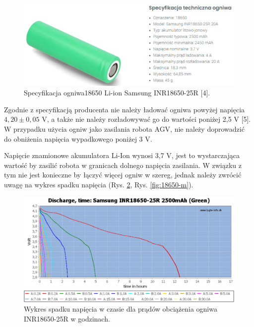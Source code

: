\documentclass{report}
\begin{document}
\begin{enumerate}[label=(\Alph*)]
    \begin{figure}[H]
        \centering
        \includegraphics{src/tech_specifications/Li-ion Samsung INR18650-25R .png}
        \caption{Specyfikacja ogniwa18650 Li-ion Samsung INR18650-25R [4].}
        \label{fig:spec-18650}
    \end{figure}

    Zgodnie z specyfikacją producenta nie należy ładować ogniwa powyżej napięcia $4,20 \pm 0,05$ V, a także nie należy rozładowywać go do wartości poniżej 2,5 V [5]. W przypadku użycia ogniw jako zasilania robota AGV, nie należy doprowadzić do obniżenia napięcia wypadkowego poniżej 3 V.
    
    Napięcie znamionowe akumulatora Li-Ion wynosi 3,7 V, jest to wystarczająca wartość by zasilić robota w granicach dolnego napięcia zasilania. W związku z tym nie jest konieczne by łączyć więcej ogniw w szereg, jednak należy zwrócić uwagę na wykres spadku napięcia (Rys. \ref{fig:18650-h}, Rys. \ref{fig:18650-m}).

    \begin{figure}[H]
        \centering
        \includegraphics{src/cells_charts/Li-ion discharge hours.png}
        \caption{Wykres spadku napięcia w czasie dla prądów obciążenia ogniwa INR18650-25R w godzinach.}
        \label{fig:18650-h}
    \end{figure}


\end{enumerate}
\end{document}
